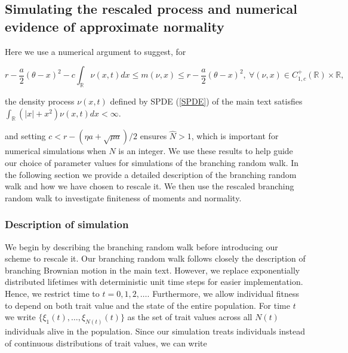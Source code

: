 \documentclass[]{article}
\begin{document}
\hypertarget{simulating-the-rescaled-process-and-numerical-evidence-of-approximate-normality}{%
\subsection{\texorpdfstring{Simulating the rescaled process and
numerical evidence of approximate normality
\label{numerical}}{Simulating the rescaled process and numerical evidence of approximate normality }}\label{simulating-the-rescaled-process-and-numerical-evidence-of-approximate-normality}}

Here we use a numerical argument to suggest, for

\begin{equation}
r-\frac{a}{2}(\theta-x)^2-c\int_\mathbb{R}\nu(x,t)dx \leq m(\nu,x)\leq r-\frac{a}{2}(\theta-x)^2, \ \forall (\nu,x)\in C_{1,c}^+(\mathbb{R})\times\mathbb{R},
\end{equation}

the density process \(\nu(x,t)\) defined by SPDE (\ref{SPDE}) of the
main text satisfies \(\int_\mathbb{R}(|x|+x^2)\nu(x,t)dx<\infty\).

and setting \(c<r-(\eta a+\sqrt{\mu a})/2\) ensures \(\hat N>1\), which
is important for numerical simulations when \(N\) is an integer. We use
these results to help guide our choice of parameter values for
simulations of the branching random walk. In the following section we
provide a detailed description of the branching random walk and how we
have chosen to rescale it. We then use the rescaled branching random
walk to investigate finiteness of moments and normality.

\hypertarget{description-of-simulation}{%
\subsubsection{\texorpdfstring{Description of simulation
\label{description}}{Description of simulation }}\label{description-of-simulation}}

We begin by describing the branching random walk before introducing our
scheme to rescale it. Our branching random walk follows closely the
description of branching Brownian motion in the main text. However, we
replace exponentially distributed lifetimes with deterministic unit time
steps for easier implementation. Hence, we restrict time to
\(t=0,1,2,\dots\). Furthermore, we allow individual fitness to depend on
both trait value and the state of the entire population. For time \(t\)
we write \(\{\xi_1(t),\dots,\xi_{N(t)}(t)\}\) as the set of trait values
across all \(N(t)\) individuals alive in the population. Since our
simulation treats individuals instead of continuous distributions of
trait values, we can write
\end{document}

